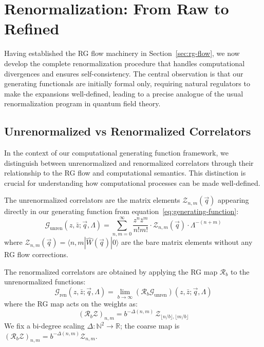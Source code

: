\section{Renormalization: From Raw to Refined}
\label{sec:renormalization}

Having established the RG flow machinery in Section~\ref{sec:rg-flow}, we now develop the complete renormalization procedure that handles computational divergences and ensures self-consistency. The central observation is that our generating functionals are initially formal only, requiring natural regulators to make the expansions well-defined, leading to a precise analogue of the usual renormalization program in quantum field theory.

\subsection{Unrenormalized vs Renormalized Correlators}

In the context of our computational generating function framework, we distinguish between unrenormalized and renormalized correlators through their relationship to the RG flow and computational semantics. This distinction is crucial for understanding how computational processes can be made well-defined.

\begin{definition}
\label{def:unrenormalized-greens}
The unrenormalized correlators are the matrix elements $\mathcal{Z}_{n,m}(\vec{q})$ appearing directly in our generating function from equation~\eqref{eq:generating-function}:
\[
\mathcal{G}_{\text{unren}}(z, \bar{z}; \vec{q}, \Lambda) = \sum_{n,m=0}^{\infty} \frac{z^n \bar{z}^m}{n! m!} \cdot \mathcal{Z}_{n,m}(\vec{q}) \cdot \Lambda^{-(n+m)}
\]
where $\mathcal{Z}_{n,m}(\vec{q}) = \langle n,m|\hat{W}(\vec{q})|0\rangle$ are the bare matrix elements without any RG flow corrections.
\end{definition}

\begin{definition}
\label{def:renormalized-greens}
The renormalized correlators are obtained by applying the RG map $\mathcal{R}_b$ to the unrenormalized functions:
\[
\mathcal{G}_{\text{ren}}(z, \bar{z}; \vec{q}, \Lambda) = \lim_{b \to \infty} (\mathcal{R}_b \mathcal{G}_{\text{unren}})(z, \bar{z}; \vec{q}, \Lambda)
\]
where the RG map acts on the weights as:
\[
(\mathcal{R}_b\mathcal{Z})_{n,m} = b^{-\Delta(n,m)}\,\mathcal{Z}_{\lfloor n/b\rfloor,\lfloor m/b\rfloor}
\]
We fix a bi-degree scaling $\Delta:\mathbb{N}^2\to\mathbb{R}$; the coarse map is $(\mathcal{R}_b\mathcal{Z})_{n,m}=b^{-\Delta(n,m)}\mathcal{Z}_{n,m}$.
\end{definition}


